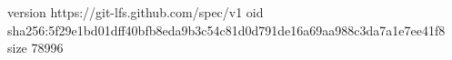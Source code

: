 version https://git-lfs.github.com/spec/v1
oid sha256:5f29e1bd01dff40bfb8eda9b3c54c81d0d791de16a69aa988c3da7a1e7ee41f8
size 78996
